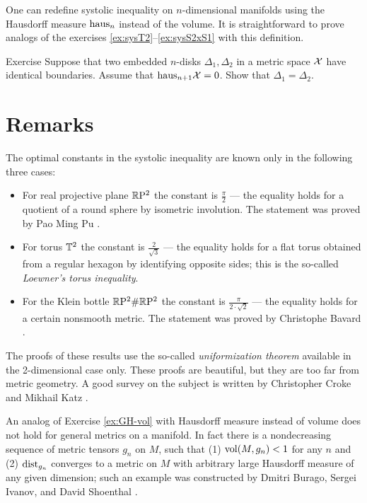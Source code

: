 One can redefine systolic inequality on $n$-dimensional manifolds using the Hausdorff measure $\mathrm{haus}_n$ instead of the volume.
It is straightforward to prove analogs of the exercises \ref{ex:sysT2}--\ref{ex:sysS2xS1} with this definition.

\begin{thm}{Exercise}\label{ex:2top-discs}
Suppose that two embedded $n$-disks $\Delta_1,\Delta_2$ in a metric space $\mathcal{X}$ have identical boundaries.
Assume that $\mathrm{haus}_{n+1}\mathcal{X}=0$.
Show that $\Delta_1=\Delta_2$.
\end{thm}

\section{Remarks}

The optimal constants in the systolic inequality are known only in the following three cases:
\begin{itemize}
\item For real projective plane $\mathbb{R}\mathrm{P}^2$ the constant is $\tfrac\pi2$ --- the equality holds for a quotient of a round sphere by isometric involution. The statement was proved by Pao Ming Pu \cite{pu}.\label{page:pu}
\item For torus $\mathbb{T}^2$ the constant is $\tfrac2{\sqrt{3}}$ --- the equality holds for a flat torus obtained from a regular hexagon by identifying opposite sides; this is the so-called \emph{Loewner's torus inequality}.
\item For the Klein bottle $\mathbb{R}\mathrm{P}^2\#\mathbb{R}\mathrm{P}^2$  the constant is $\tfrac\pi{2\cdot\sqrt2}$ --- the equality holds for a certain nonsmooth metric.
The statement was proved by Christophe Bavard \cite{bavard}.
\end{itemize}
The proofs of these results use the so-called {}\emph{uniformization theorem}   available in the 2-dimensional case only.
These proofs are beautiful, but they are too far from metric geometry.
A good survey on the subject is written by Christopher Croke and Mikhail Katz \cite{croke-katz}.

An analog of Exercise \ref{ex:GH-vol} with Hausdorff measure instead of volume does not hold for general metrics on a manifold.
In fact there is a nondecreasing sequence of metric tensors $g_n$ on $M$, such that (1) $\operatorname{\rm vol}\nolimits(M,g_n)<1$ for any $n$ and (2) $\mathrm{dist}_{g_n}$ converges to a metric on $M$ with arbitrary large Hausdorff measure of any given dimension; such an example was constructed by Dmitri Burago, Sergei Ivanov, and David Shoenthal \cite{burago-ivanov-shoenthal}.
